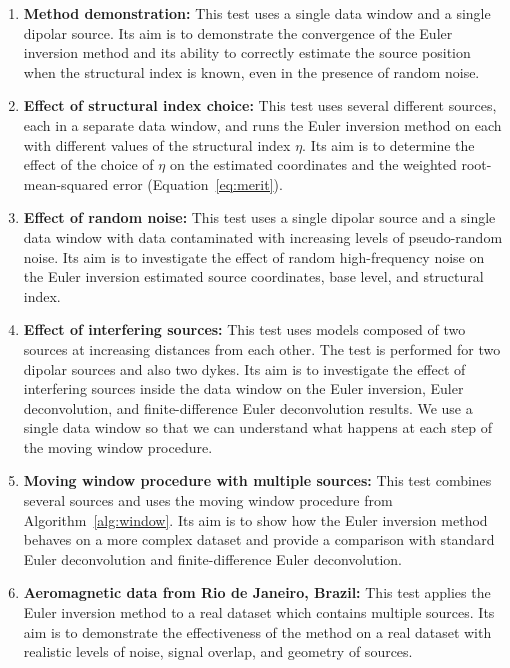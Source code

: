 \begin{enumerate}
    \item \textbf{Method demonstration:} This test uses a single data window
        and a single dipolar source. Its aim is to demonstrate the convergence
        of the Euler inversion method and its ability to correctly estimate
        the source position when the structural index is known, even in the
        presence of random noise.
    \item \textbf{Effect of structural index choice:} This test uses several
        different sources, each in a separate data window, and runs the Euler
        inversion method on each with different values of the structural index
        $\eta$. Its aim is to determine the effect of the choice of $\eta$ on
        the estimated coordinates and the weighted root-mean-squared error
        (Equation~\ref{eq:merit}).
    \item \textbf{Effect of random noise:} This test uses a single dipolar
        source and a single data window with data contaminated with increasing
        levels of pseudo-random noise. Its aim is to investigate the effect of
        random high-frequency noise on the Euler inversion estimated source
        coordinates, base level, and structural index.
    \item \textbf{Effect of interfering sources:} This test uses models
        composed of two sources at increasing distances from each other. The
        test is performed for two dipolar sources and also two dykes. Its aim
        is to investigate the effect of interfering sources inside the data
        window on the Euler inversion, Euler deconvolution, and
        finite-difference Euler deconvolution results. We use a single data
        window so that we can understand what happens at each step of the
        moving window procedure.
    \item \textbf{Moving window procedure with multiple sources:} This test
        combines several sources and uses the moving window procedure from
        Algorithm~\ref{alg:window}. Its aim is to show how the Euler inversion
        method behaves on a more complex dataset and provide a comparison with
        standard Euler deconvolution and finite-difference Euler deconvolution.
    \item \textbf{Aeromagnetic data from Rio de Janeiro, Brazil:} This test applies
        the Euler inversion method to a real dataset which contains multiple
        sources. Its aim is to demonstrate the effectiveness of the method
        on a real dataset with realistic levels of noise, signal overlap,
        and geometry of sources.
\end{enumerate}

